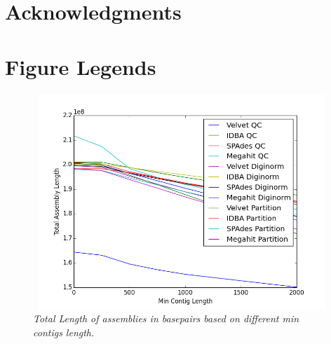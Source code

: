 
\section*{Acknowledgments}



%
%
% 





\section*{Figure Legends}
%
\begin{figure} [h] 
 
\begin{center}  
 

\includegraphics[height=3.2in,width=4.5in]{mincontigs.png}  
\caption{\small \sl Total Length of assemblies in basepairs based on different min contigs length.\label{fig:mincontig}}  
\end{center}  
\end{figure}  
 

